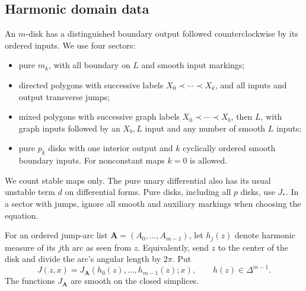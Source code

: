 \subsection{Harmonic domain data}

An $m$-disk has a distinguished boundary output followed
counterclockwise by its ordered inputs.  We use four sectors:
\begin{itemize}
\item pure $m_k$, with all boundary on $L$ and smooth input markings;
\item directed polygons with successive labels
$X_0\prec\cdots\prec X_k$, and all inputs and output transverse jumps;
\item mixed polygons with successive graph labels
$X_0\prec\cdots\prec X_b$, then $L$, with graph inputs followed by an
$X_b,L$ input and any number of smooth $L$ inputs;
\item pure $p_k$ disks with one interior output and $k$ cyclically
ordered smooth boundary inputs.  For nonconstant maps $k=0$ is allowed.
\end{itemize}
We count stable maps only.  The pure unary differential also has its
usual unstable term $d$ on differential forms.  Pure disks, including
all $p$ disks, use $J_*$.  In a sector with jumps, ignore all smooth and
auxiliary markings when choosing the equation.

For an ordered jump-arc list $\mathbf A=(A_0,\ldots,A_{m-1})$, let
$h_j(z)$ denote harmonic measure of its $j$th arc as seen from $z$.
Equivalently, send $z$ to the center of the disk and divide the arc's
angular length by $2\pi$.  Put
\begin{equation}\label{local:harmonic-J}
 J(z,x)=J_{\mathbf A}(h_0(z),\ldots,h_{m-1}(z);x),
 \qquad h(z)\in\Delta^{m-1}.
\end{equation}
The functions $J_{\mathbf A}$ are smooth on the closed simplices.

